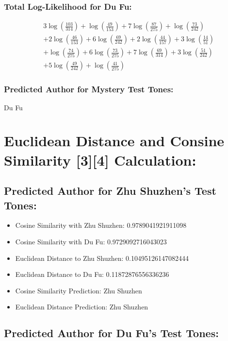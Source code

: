 \documentclass[12pt]{article}
\begin{document}
\subsubsection*{Total Log-Likelihood for Du Fu:}

\[
\begin{aligned}
    &3 \log\left(\frac{103}{314}\right) + \log\left(\frac{49}{153}\right) + 7 \log\left(\frac{87}{275}\right) + \log\left(\frac{73}{242}\right) \\
    &+ 2 \log\left(\frac{46}{153}\right) + 6 \log\left(\frac{69}{242}\right) + 2 \log\left(\frac{44}{157}\right) + 3 \log\left(\frac{14}{51}\right) \\
    &+ \log\left(\frac{74}{275}\right) + 6 \log\left(\frac{73}{275}\right) + 7 \log\left(\frac{69}{314}\right) + 3 \log\left(\frac{51}{242}\right) \\
    &+ 5 \log\left(\frac{49}{242}\right) + \log\left(\frac{41}{275}\right)
\end{aligned}
\]

\subsubsection*{Predicted Author for Mystery Test Tones: }
Du Fu

\section*{Euclidean Distance and Consine Similarity [3][4] Calculation: }


\subsection*{Predicted Author for Zhu Shuzhen's Test Tones:}

\begin{itemize}
    \item Cosine Similarity with Zhu Shuzhen: 0.9789041921911098
    \item Cosine Similarity with Du Fu: 0.9729092716043023
    \item Euclidean Distance to Zhu Shuzhen: 0.10495126147082444
    \item Euclidean Distance to Du Fu: 0.11872876556336236
    \item Cosine Similarity Prediction: Zhu Shuzhen
    \item Euclidean Distance Prediction: Zhu Shuzhen
\end{itemize}

\subsection*{Predicted Author for Du Fu's Test Tones:}
\end{document}
